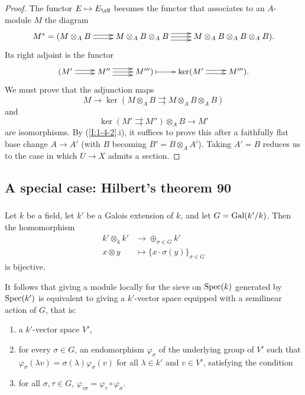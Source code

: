 \begin{proof}
The functor $E\mapsto E_\cU$ becomes the functor that associates to an
$A$-module $M$ the diagram
\[\xymatrix{
  M^* = (M\otimes_A B \ar@<2pt>[r] \ar@<-2pt>[r]
    & M\otimes_A B\otimes_A B \ar@<-4pt>[r] \ar[r] \ar@<4pt>[r]
    & M\otimes_A B\otimes_A B\otimes_A B)\text{.}
}\]
Its right adjoint is the functor
\[\xymatrix{
  (M' \ar@<2pt>[r] \ar@<-2pt>[r]
    & M'' \ar@<-4pt>[r] \ar[r] \ar@<4pt>[r]
    & M''') \ar@{|->}[r]
    & \ker(M' \ar@<2pt>[r] \ar@<-2pt>[r]
    & M''')\text{.}
}\]
We must prove that the adjunction maps
\[
  M \to\ker(M\otimes_A B\rightrightarrows M\otimes_A B\otimes_A B)
\]
and
\[
  \ker(M'\rightrightarrows M'')\otimes_A B \to M'
\]
are isomorphisms. By (\ref{I:1-4-2}.i), it suffices to prove this after
a faithfully flat base change $A\to A'$ (with $B$ becoming
$B'=B\otimes_AA'$). Taking $A'=B$ reduces us to the case in which
$U\to X$ admits a section.
\end{proof}

\subsection{A special case: Hilbert's theorem 90}\label{I:1-5}

\subsubsection{}\label{I:1-5-1}

Let $k$ be a field, let $k'$ be a Galois extension of $k$, and let
$G=\operatorname{Gal}(k'/k)$. Then the homomorphism
\begin{align*}
  k'\otimes_k k' &\to \oplus_{\sigma\in G} k' \\
  x\otimes y     &\mapsto \{x\cdot \sigma(y)\}_{\sigma\in G}
\end{align*}
is bijective.

It follows that giving a module locally for the sieve on $\operatorname{Spec}(k)$
generated by $\operatorname{Spec}(k')$ is equivalent to giving a $k'$-vector space
equipped with a semilinear action of $G$, that is:
\begin{enumerate}[\indent a)]
  \item a $k'$-vector space $V'$,
  \item for every $\sigma\in G$, an endomorphism $\varphi_\sigma$ of the
    underlying group of $V'$ such that
    $\varphi_\sigma(\lambda v)=\sigma(\lambda)\varphi_\sigma(v)$ for all
    $\lambda\in k'$ and $v\in V'$, satisfying the condition
  \item for all $\sigma,\tau\in G$,
    $\varphi_{\tau\sigma}=\varphi_\tau\circ\varphi_\sigma$.
\end{enumerate}

